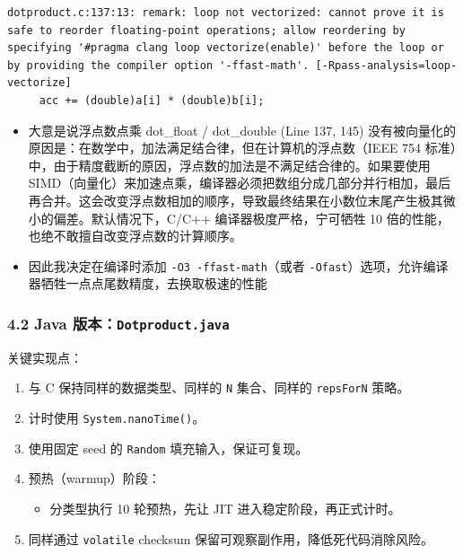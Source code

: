 \documentclass[12pt,fontset=none]{ctexart}
\providecommand{\tightlist}{%
  \setlength{\itemsep}{0pt}\setlength{\parskip}{0pt}}
\begin{document}
\begin{enumerate}
\begin{verbatim}
dotproduct.c:137:13: remark: loop not vectorized: cannot prove it is safe to reorder floating-point operations; allow reordering by specifying '#pragma clang loop vectorize(enable)' before the loop or by providing the compiler option '-ffast-math'. [-Rpass-analysis=loop-vectorize]
     acc += (double)a[i] * (double)b[i];
\end{verbatim}

  \begin{itemize}
  \tightlist
  \item
    大意是说浮点数点乘 dot\_float / dot\_double (Line 137, 145)
    没有被向量化的原因是：在数学中，加法满足结合律，但在计算机的浮点数（IEEE
    754
    标准）中，由于精度截断的原因，浮点数的加法是不满足结合律的。如果要使用
    SIMD（向量化）来加速点乘，编译器必须把数组分成几部分并行相加，最后再合并。这会改变浮点数相加的顺序，导致最终结果在小数位末尾产生极其微小的偏差。默认情况下，C/C++
    编译器极度严格，宁可牺牲 10
    倍的性能，也绝不敢擅自改变浮点数的计算顺序。
  \item
    因此我决定在编译时添加 \texttt{-O3\ -ffast-math}（或者
    \texttt{-Ofast}）选项，允许编译器牺牲一点点尾数精度，去换取极速的性能
  \end{itemize}
\end{enumerate}

\subsubsection{\texorpdfstring{4.2 Java
版本：\texttt{Dotproduct.java}}{4.2 Java 版本：Dotproduct.java}}\label{42-java-ux7248ux672cdotproductjava}

关键实现点：

\begin{enumerate}
\def\labelenumi{\arabic{enumi}.}
\tightlist
\item
  与 C 保持同样的数据类型、同样的 \texttt{N} 集合、同样的
  \texttt{repsForN} 策略。
\item
  计时使用 \texttt{System.nanoTime()}。
\item
  使用固定 seed 的 \texttt{Random} 填充输入，保证可复现。
\item
  预热（warmup）阶段：

  \begin{itemize}
  \tightlist
  \item
    分类型执行 10 轮预热，先让 JIT 进入稳定阶段，再正式计时。
  \end{itemize}
\item
  同样通过 \texttt{volatile} checksum
  保留可观察副作用，降低死代码消除风险。
\end{enumerate}
\end{document}

